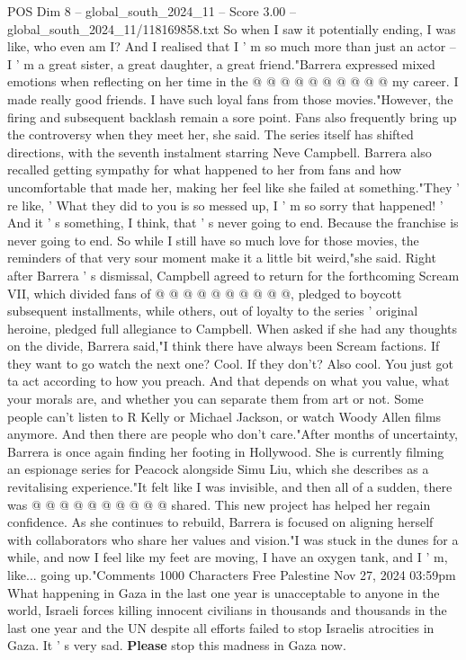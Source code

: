 \begin{textsample}{POS Dim 8 – global\_south\_2024\_11 – Score 3.00 – global\_south\_2024\_11/118169858.txt}
So when I saw it potentially ending, I was like, who even am I?
And I realised that I ' m so much more than just an actor -- I ' m a great sister, a great daughter, a great friend."Barrera expressed mixed emotions when reflecting on her time in the @ @ @ @ @ @ @ @ @ @ my career.
I made really good friends.
I have such loyal fans from those movies."However, the firing and subsequent backlash remain a sore point.
Fans also frequently bring up the controversy when they meet her, she said.
The series itself has shifted directions, with the seventh instalment starring Neve Campbell.
Barrera also recalled getting sympathy for what happened to her from fans and how uncomfortable that made her, making her feel like she failed at something."They ' re like, ' What they did to you is so messed up, I ' m so sorry that happened! ' And it ' s something, I think, that ' s never going to end.
Because the franchise is never going to end.
So while I still have so much love for those movies, the reminders of that very sour moment make it a little bit weird,"she said.
Right after Barrera ' s dismissal, Campbell agreed to return for the forthcoming Scream VII, which divided fans of @ @ @ @ @ @ @ @ @ @, pledged to boycott subsequent installments, while others, out of loyalty to the series ' original heroine, pledged full allegiance to Campbell.
When asked if she had any thoughts on the divide, Barrera said,"I think there have always been Scream factions.
If they want to go watch the next one?
Cool.
If they don't?
Also cool.
You just got ta act according to how you preach.
And that depends on what you value, what your morals are, and whether you can separate them from art or not.
Some people can't listen to R Kelly or Michael Jackson, or watch Woody Allen films anymore.
And then there are people who don't care."After months of uncertainty, Barrera is once again finding her footing in Hollywood.
She is currently filming an espionage series for Peacock alongside Simu Liu, which she describes as a revitalising experience."It felt like I was invisible, and then all of a sudden, there was @ @ @ @ @ @ @ @ @ @ shared.
This new project has helped her regain confidence.
As she continues to rebuild, Barrera is focused on aligning herself with collaborators who share her values and vision."I was stuck in the dunes for a while, and now I feel like my feet are moving, I have an oxygen tank, and I ' m, like... going up."Comments 1000 Characters Free Palestine Nov 27, 2024 03:59pm What happening in Gaza in the last one year is unacceptable to anyone in the world, Israeli forces killing innocent civilians in thousands and thousands in the last one year and the UN despite all efforts failed to stop Israelis atrocities in Gaza.
It ' s very sad. \textbf{Please} stop this madness in Gaza now.

\end{textsample}

